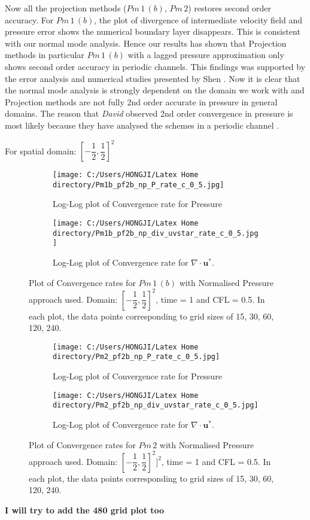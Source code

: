 Now all the projection methods ($Pm\,1\,(b),\,Pm\,2$) restores second order accuracy. For $Pm\,1\,(b)$, the plot of divergence of intermediate velocity field and pressure error shows the numerical boundary layer disappears. This is consistent with our normal mode analysis. Hence our results has shown that Projection methods in particular $Pm\,1\,(b)$ with a lagged pressure approximation only shows second order accuracy in periodic channels. This findings was supported by the error analysis and numerical studies presented by Shen \cite{guermond2004error}. Now it is clear that the normal mode analysis is strongly dependent on the domain we work with and Projection methods are not fully 2nd order accurate in pressure in general domains. The reason that \emph{David} observed 2nd order convergence in pressure is most likely because they have analysed the schemes in a periodic channel \cite{brown2001accurate, guermond2006overview, guermond2004error}.

For spatial domain: $[-\dfrac{1}{2}, \dfrac{1}{2}]^2$
\begin{figure}[H]
	\centering
	\begin{subfigure}[t]{4.5in}
		\centering
		\texttt{[image: C:/Users/HONGJI/Latex Home directory/Pm1b\_pf2b\_np\_P\_rate\_c\_0\_5.jpg]}
		\caption{Log-Log plot of Convergence rate for Pressure}\label{fig:6.19a}		
	\end{subfigure}
	\quad
	\begin{subfigure}[t]{4.5in}
		\centering
		\texttt{[image: C:/Users/HONGJI/Latex Home directory/Pm1b\_pf2b\_np\_div\_uvstar\_rate\_c\_0\_5.jpg]}
		\caption{Log-Log plot of Convergence rate for $\nabla \cdot \textbf{u}^*$. }\label{fig:6.19b}
	\end{subfigure}
	\caption{Plot of Convergence rates for $Pm\,1\,(b)$ with Normalised Pressure approach used. Domain:  $[-\dfrac{1}{2}, \dfrac{1}{2}]^2$, time = 1 and CFL = 0.5. In each plot, the data points corresponding to grid sizes of 15, 30, 60, 120, 240.}\label{fig:6.16}
\end{figure}

\begin{figure}[H]
	\centering
	\begin{subfigure}[t]{4.5in}
		\centering
		\texttt{[image: C:/Users/HONGJI/Latex Home directory/Pm2\_pf2b\_np\_P\_rate\_c\_0\_5.jpg]}
		\caption{Log-Log plot of Convergence rate for Pressure}\label{fig:6.19a}		
	\end{subfigure}
	\quad
	\begin{subfigure}[t]{4.5in}
		\centering
		\texttt{[image: C:/Users/HONGJI/Latex Home directory/Pm2\_pf2b\_np\_div\_uvstar\_rate\_c\_0\_5.jpg]}
		\caption{Log-Log plot of Convergence rate for $\nabla \cdot \textbf{u}^*$. }\label{fig:6.19b}
	\end{subfigure}
	\caption{Plot of Convergence rates for $Pm\,2$ with Normalised Pressure approach used. Domain: $[-\dfrac{1}{2}, \dfrac{1}{2}]^2]^2$, time = 1 and CFL = 0.5. In each plot, the data points corresponding to grid sizes of 15, 30, 60, 120, 240.}\label{fig:6.16}
\end{figure}
\textbf{I will try to add the 480 grid plot too}


